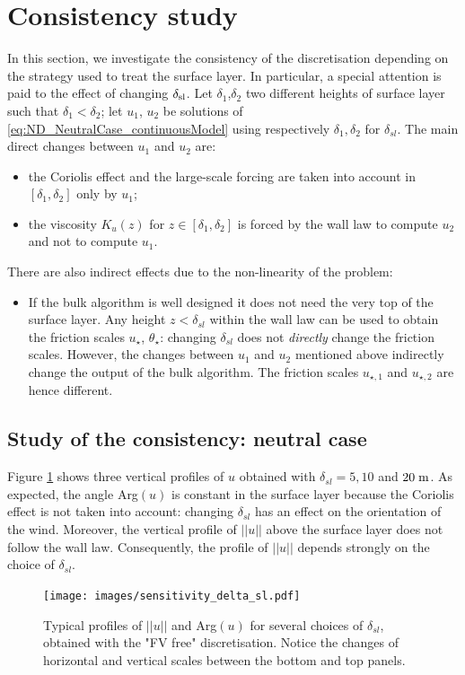 \section{Consistency study}
\label{sec:ND_Consistency}
In this section, we investigate the consistency of the
discretisation depending on the strategy used to treat the
surface layer. In particular, a special attention is paid to
the effect of changing $\delta_{\rm sl}$.
Let $\delta_1$,$\delta_2$ two
different heights of surface layer
such that $\delta_1 < \delta_2$;
let $u_1$, $u_2$ be solutions of 
\eqref{eq:ND_NeutralCase_continuousModel} using
respectively $\delta_1, \delta_2$ for $\delta_{sl}$.
The main direct changes between $u_1$ and $u_2$ are:
\begin{itemize}
\item the Coriolis effect and the large-scale forcing are
taken into account in $[\delta_{1}, \delta_{2}]$
		only by $u_1$;
\item the viscosity $K_u(z)$ for $z \in [\delta_{1}, \delta_{2}]$
	is forced by the wall law to compute $u_2$
		and not to compute $u_1$.
\end{itemize}
There are also indirect effects due to the non-linearity of the
problem:
\begin{itemize}
	\item If the bulk algorithm is well designed it does not
		need the very top of the surface layer. Any height
		$z<\delta_{sl}$ within the wall law can be used
		to obtain the friction scales $u_\star$,
		$\theta_\star$: changing $\delta_{sl}$ does
		not \textit{directly} change the friction scales.
		However, the changes between $u_1$ and $u_2$ mentioned
		above indirectly change the output of the
		bulk algorithm.
		The friction scales $u_{\star, 1}$ and $u_{\star, 2}$
		are hence different.
\end{itemize}
\subsection{Study of the consistency: neutral case}
Figure \ref{fig:ND_Consistency_sensitivity_delta_sl} shows
three vertical profiles of $u$ obtained with
$\delta_{sl} = 5, 10$ and $20 \; {\rm m}$.
As expected, the angle Arg$(u)$
is constant in the surface layer because
the Coriolis effect is not taken into
account: changing $\delta_{sl}$
has an effect on the orientation of the wind.
Moreover, the vertical profile of $||u||$ above the
surface layer does not follow the wall law.
Consequently, the profile of $||u||$ depends strongly
on the choice of $\delta_{sl}$.
%
\begin{figure}
	\centering
\texttt{[image: images/sensitivity\_delta\_sl.pdf]}
	\caption{Typical profiles of $||u||$ and Arg$(u)$ for several
	choices of $\delta_{sl}$, obtained with the "FV free"
	discretisation. Notice the changes of horizontal
	and vertical scales between the bottom and top panels.}
	\label{fig:ND_Consistency_sensitivity_delta_sl}
\end{figure}

